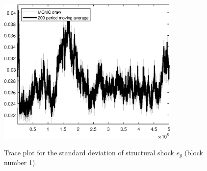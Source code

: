 \begin{figure}[H]
\centering
  \includegraphics[width=0.8\textwidth]{BRS_growth_ext_fd/graphs/TracePlot_SE_e_g_blck_1}\\
    \caption{Trace plot for the standard deviation of structural shock ${e_g}$ (block number 1).}
\end{figure}
